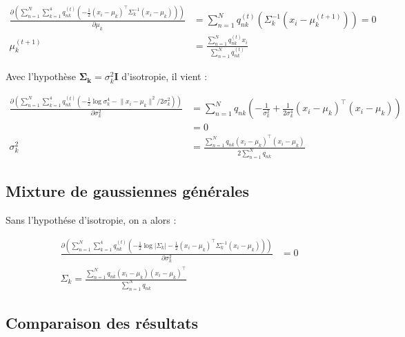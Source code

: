 \documentclass[12pt,a4paper,onecolumn]{article}
\begin{document}
\begin{equation}
	\begin{split}
		\frac{\partial\left(\sum_{n = 1}^N\sum_{k = 1}^4q_{nk}^{(t)}\left(
		-\frac{1}{2}\left(x_i - \mu_k\right)^{\intercal}\Sigma_k^{-1}\left(x_i - \mu_k\right)\right)\right)}{\partial\mu_k} &=
		\sum_{n = 1}^Nq_{nk}^{(t)}\left(\Sigma_k^{-1}(x_i-\mu_k^{(t+1)})\right) = 0\\
		\mu_k^{(t + 1)} &= \frac{\sum_{n = 1}^Nq_{nk}^{(t)}x_i}{\sum_{n = 1}^Nq_{nk}^{(t)}}
	\end{split}
\end{equation}

Avec l'hypothèse \(\bm{\Sigma_k} = \sigma_k^2\bm{I}\) d'isotropie, il vient :


\begin{equation}
	\begin{split}
		\frac{\partial\left(\sum_{n = 1}^N\sum_{k = 1}^4q_{nk}^{(t)}\left(
		-\frac{1}{2}\log\sigma_k^4-\lVert x_i - \mu_k\rVert^2 / 2\sigma_k^2\right)\right)}{\partial\sigma_k^2} &=
		\sum_{n = 1}^Nq_{nk}\left(-\frac{1}{\sigma_k^2} +\frac{1}{2\sigma_k^4}\left(x_i-\mu_k\right)^{\intercal}\left(x_i-\mu_k\right)\right)\\
		&= 0 \\
		\sigma_k^2 &= \frac{\sum_{n = 1}^Nq_{nk}\left(x_i-\mu_k\right)^{\intercal}\left(x_i-\mu_k\right)}{2\sum_{n = 1}^Nq_{nk}}
	\end{split}
\end{equation}


\subsection{Mixture de gaussiennes générales}

Sans l'hypothése d'isotropie, on a alors :

\begin{equation}
	\begin{split}
		\frac{\partial\left(\sum_{n = 1}^N\sum_{k = 1}^4q_{nk}^{(t)}\left(
		-\frac{1}{2}\log|\Sigma_k|-\frac{1}{2}\left(x_i - \mu_k\right)^{\intercal}\Sigma_k^{-1}\left(x_i - \mu_k\right)\right)\right)}{\partial\sigma_k^2} &= 0\\
		\Sigma_k = \frac{\sum_{n = 1}^Nq_{nk}\left(x_i-\mu_k\right)\left(x_i-\mu_k\right)^{\intercal}}{\sum_{n = 1}^Nq_{nk}}
	\end{split}
\end{equation}

\subsection{Comparaison des résultats}
\end{document}
